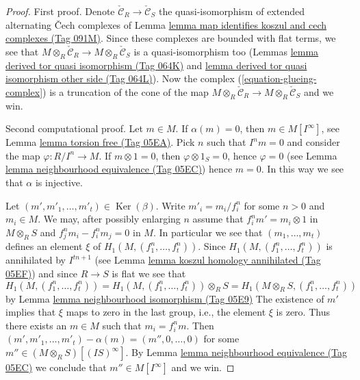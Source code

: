 \documentclass{amsart}
\theoremstyle{plain}
\theoremstyle{definition}
\theoremstyle{remark}
\numberwithin{equation}{subsection}
\def\Ker{\mathop{\mathrm{Ker}}}
\begin{document}
\begin{proof}
First proof. Denote $\check{\mathcal{C}}_R \to \check{\mathcal{C}}_S$
the quasi-isomorphism of extended alternating {\v C}ech complexes of
Lemma \href{https://stacks.math.columbia.edu/tag/091M}{lemma map identifies koszul and cech complexes (Tag 091M)}.
Since these complexes are bounded with flat terms, we see that
$M \otimes_R \check{\mathcal{C}}_R \to M \otimes_R \check{\mathcal{C}}_S$
is a quasi-isomorphism too (Lemmas
\href{https://stacks.math.columbia.edu/tag/064K}{lemma derived tor quasi isomorphism (Tag 064K)} and
\href{https://stacks.math.columbia.edu/tag/064L}{lemma derived tor quasi isomorphism other side (Tag 064L)}). Now the complex
(\ref{equation-glueing-complex}) is a truncation of the cone
of the map
$M \otimes_R \check{\mathcal{C}}_R \to M \otimes_R \check{\mathcal{C}}_S$
and we win.

\medskip\noindent
Second computational proof.
Let $m \in M$. If $\alpha(m) = 0$, then $m \in M[I^\infty]$, see
Lemma \href{https://stacks.math.columbia.edu/tag/05EA}{lemma torsion free (Tag 05EA)}. Pick $n$ such that $I^n m = 0$
and consider the map $\varphi : R/I^n \to M$.
If $m \otimes 1 = 0$, then $\varphi \otimes 1_S = 0$, hence
$\varphi = 0$ (see
Lemma \href{https://stacks.math.columbia.edu/tag/05EC}{lemma neighbourhood equivalence (Tag 05EC)})
hence $m = 0$. In this way we see that $\alpha$ is injective.

\medskip\noindent
Let $(m', m'_1, \ldots, m'_t) \in \Ker(\beta)$.
Write $m'_i = m_i/f_i^n$ for some $n > 0$ and $m_i \in M$.
We may, after possibly enlarging $n$ assume that
$f_i^n m' = m_i \otimes 1$ in $M \otimes_R S$ and
$f_j^nm_i - f_i^nm_j = 0$ in $M$.
In particular we see that
$(m_1, \ldots, m_t)$ defines an element $\xi$ of
$H_1(M, (f_1^n, \ldots, f_t^n))$.
Since $H_1(M, (f_1^n, \ldots, f_t^n))$ is annihilated by $I^{tn + 1}$ (see
Lemma \href{https://stacks.math.columbia.edu/tag/05EF}{lemma koszul homology annihilated (Tag 05EF)})
and since $R \to S$ is flat we see that
$$
H_1(M, (f_1^n, \ldots, f_t^n)) =
H_1(M, (f_1^n, \ldots, f_t^n)) \otimes_R S =
H_1(M \otimes_R S, (f_1^n, \ldots, f_t^n))
$$
by
Lemma \href{https://stacks.math.columbia.edu/tag/05E9}{lemma neighbourhood isomorphism (Tag 05E9)}
The existence of $m'$ implies that $\xi$ maps to zero in the last group, i.e.,
the element $\xi$ is zero. Thus there exists an $m \in M$ such that
$m_i = f_i^n m$. Then $(m', m'_1, \ldots, m'_t) - \alpha(m)
= (m'', 0, \ldots, 0)$ for some $m'' \in (M \otimes_R S)[(IS)^\infty]$.
By
Lemma \href{https://stacks.math.columbia.edu/tag/05EC}{lemma neighbourhood equivalence (Tag 05EC)}
we conclude that $m'' \in M[I^\infty]$ and we win.
\end{proof}
\end{document}
